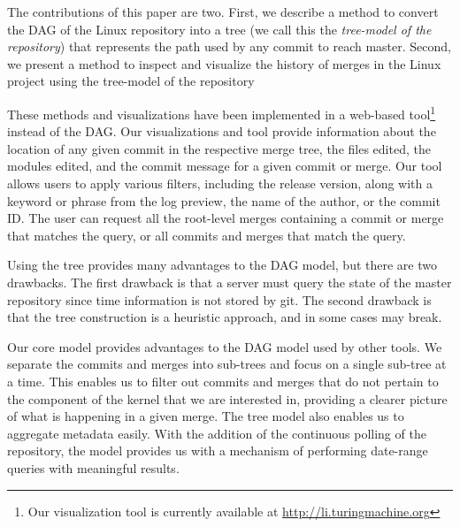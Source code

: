 \documentclass[conference, draftclsnofoot, draft]{IEEEtran}
\begin{document}


 The contributions of this paper are two. First, we describe a method to convert the DAG of the Linux repository into a tree (we call this the \emph{tree-model of the
 repository}) that represents the path used by
 any commit to reach master. Second, 
 we present a method to inspect and visualize the history of merges in the  Linux project using the tree-model of the repository
 
These methods and visualizations have been implemented in a web-based
tool\footnote{Our visualization tool is currently available at \url{http://li.turingmachine.org}}
instead of the DAG. Our visualizations and tool provide information about the location of any given
commit in the respective merge tree, the files edited, the modules edited, and the
commit message for a given commit or merge. Our tool allows users to apply various
filters, including the release version, along with a keyword or phrase from the log
preview, the name of the author, or the commit ID. The user can request all the
root-level merges containing a commit or merge that matches the query, or all
commits and merges that match the query.




Using the tree provides many advantages to the DAG model, but there are two
drawbacks. The first drawback is that a server must query the state of the master
repository since time information is not stored by git. The second drawback is that
the tree construction is a heuristic approach, and in some cases may break.

Our core model provides advantages to the DAG model used by other tools. We separate
the commits and merges into sub-trees and focus on a single sub-tree at a time. This
enables us to filter out commits and merges that do not pertain to the component of
the kernel that we are interested in, providing a clearer picture of what is
happening in a given merge. The tree model also enables us to aggregate metadata
easily. With the addition of the continuous polling of the repository, the model
provides us with a mechanism of performing date-range queries with meaningful
results.
\end{document}
